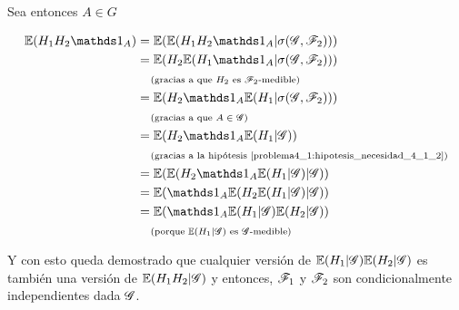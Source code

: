 Sea entonces $A \in G$

\begin{align}
        \E(H_1 H_2 \indic_A)    &=  \E(\E(H_1 H_2 \indic_A | \sigma(\G, \F_2)))                                     \\
                                &=  \E(H_2 \E(H_1 \indic_A | \sigma(\G, \F_2)))                                     \\
                                &\comment{gracias a que $H_2$ es $\F_2$-medible}                                    \\
                                &=  \E(H_2 \indic_A \E(H_1  | \sigma(\G, \F_2)))                                    \\
                                &\comment{gracias a que $A \in \G$}                                                 \\
                                &=  \E(H_2 \indic_A \E(H_1  | \G))                                                  \\
                                &\comment{gracias a la hipótesis \eqref{problema4_1:hipotesis_necesidad_4_1_2}}     \\
                                &=  \E(\E(H_2 \indic_A \E(H_1  | \G) | \G))                                         \\
                                &=  \E(\indic_A \E(H_2  \E(H_1  | \G) | \G))                                        \\
                                &=  \E(\indic_A \E(H_1  | \G) \E(H_2 | \G))                                         \\
                                &\comment{porque $\E(H_1  | \G)$ es $\G$-medible}
\end{align}

Y con esto queda demostrado que cualquier versión de $\mathbb{E}(H_1  | \mathscr{G}) \mathbb{E}(H_2 | \mathscr{G})$ es también una versión de $\mathbb{E}(H_1 H_2 | \mathscr{G})$
y entonces, $\mathscr{F}_1$ y $\mathscr{F}_2$ son condicionalmente independientes dada $\mathscr{G}$.